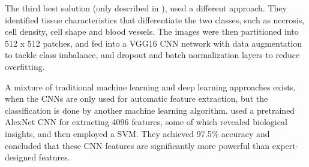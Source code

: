 The third best solution (only described in \cite{Kurc2020}), used a different approach. They identified tissue characteristics that differentiate the two classes, such as necrosis, cell density, cell shape and blood vessels. The images were then partitioned into 512 x 512 patches, and fed into a VGG16 CNN network with data augmentation to tackle class imbalance, and dropout and batch normalization layers to reduce overfitting.

A mixture of traditional machine learning and deep learning approaches exists, when the CNNs are only used for automatic feature extraction, but the classification is done by another machine learning algorithm. \cite{xu2017} used a pretrained AlexNet CNN for extracting 4096 features, some of which revealed biological insights, and then employed a SVM. They achieved 97.5\% accuracy and concluded that these CNN features are significantly more powerful than expert-designed features.


